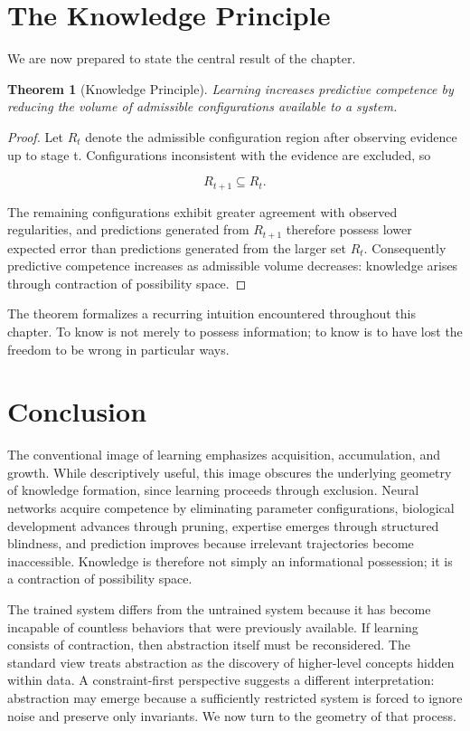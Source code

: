 \documentclass[11pt,oneside]{book}
\theoremstyle{plain}
\newtheorem{theorem}{Theorem}[chapter]
\theoremstyle{definition}
\theoremstyle{remark}
\begin{document}
\section{The Knowledge Principle}

We are now prepared to state the central result of the chapter.

\begin{theorem}[Knowledge Principle]
Learning increases predictive competence by reducing the volume of admissible configurations available to a system.
\end{theorem}

\begin{proof}
Let \(R_t\) denote the admissible configuration region after observing evidence up to stage t. Configurations inconsistent with the evidence are excluded, so

\begin{equation}
R_{t+1}
\subseteq
R_t.
\end{equation}

The remaining configurations exhibit greater agreement with observed regularities, and predictions generated from \(R_{t+1}\) therefore possess lower expected error than predictions generated from the larger set \(R_t\). Consequently predictive competence increases as admissible volume decreases: knowledge arises through contraction of possibility space.
\end{proof}

The theorem formalizes a recurring intuition encountered throughout this chapter. To know is not merely to possess information; to know is to have lost the freedom to be wrong in particular ways.

\section{Conclusion}

The conventional image of learning emphasizes acquisition, accumulation, and growth. While descriptively useful, this image obscures the underlying geometry of knowledge formation, since learning proceeds through exclusion. Neural networks acquire competence by eliminating parameter configurations, biological development advances through pruning, expertise emerges through structured blindness, and prediction improves because irrelevant trajectories become inaccessible. Knowledge is therefore not simply an informational possession; it is a contraction of possibility space.

The trained system differs from the untrained system because it has become incapable of countless behaviors that were previously available. If learning consists of contraction, then abstraction itself must be reconsidered. The standard view treats abstraction as the discovery of higher-level concepts hidden within data. A constraint-first perspective suggests a different interpretation: abstraction may emerge because a sufficiently restricted system is forced to ignore noise and preserve only invariants. We now turn to the geometry of that process.
\end{document}
